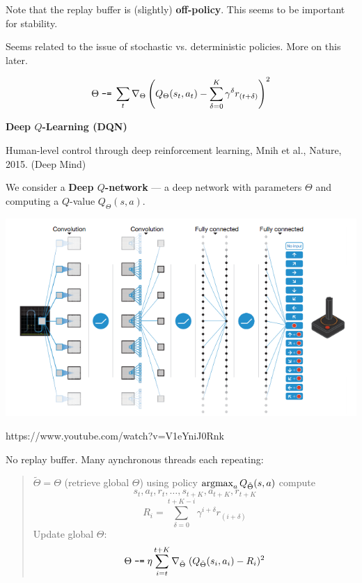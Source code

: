 {Note that the replay buffer is (slightly) {\bf off-policy}.  This seems to be important for stability.

\vfill
Seems related to the issue of stochastic vs. deterministic policies.  More on this later.


$$\Theta \;\mbox{\tt -=} \;\sum_t \nabla_\Theta \left(Q_\Theta(s_t,a_t) - \sum_{\delta = 0}^{K} \gamma^\delta r_{(t+\delta)}\right)^2$$


\slide{}
\centerline{\bf Deep $Q$-Learning (DQN)}

\vfill
Human-level control through deep reinforcement learning, Mnih et al., Nature, 2015. (Deep Mind)
\vfill
\vfill


\vfill
We consider a {\bf Deep $Q$-network} --- a deep network with parameters $\Theta$ and computing a $Q$-value
$Q_\Theta(s,a)$.

\vfill
\centerline{\includegraphics[width=6in]{../images/DQN}}


https://www.youtube.com/watch?v=V1eYniJ0Rnk

No replay buffer.
Many aynchronous threads each repeating:
\vfill

  \begin{quotation}
  \noindent $\tilde{\Theta} = \Theta$ (retrieve global $\Theta$)\newline \newline
  \noindent using policy $\operatorname*{argmax}_a Q_{\tilde{\Theta}}(s,a)$ compute $$s_t,a_t,r_t,\ldots,s_{t+K},a_{t+K},r_{t+K}$$
  $$R_i = \sum_{\delta=0}^{t+K-i} \gamma^{i+\delta} r_{(i+\delta)}$$
  Update global $\Theta$:
  $$\Theta \;\mbox{\tt -=}\; \eta \sum_{i=t}^{t+K} \nabla_{\tilde{\Theta}}\;(Q_{\tilde{\Theta}}(s_i,a_i) - R_i)^2$$
  \end{quotation}

}
